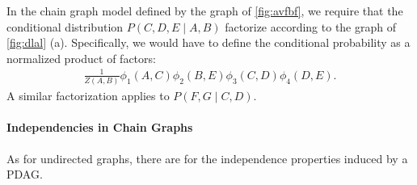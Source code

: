 \documentclass{article}
\begin{document}
\begin{exma}
In the chain graph model defined by the graph of \cref{fig:avfbf}, we require that the conditional distribution $P(C, D, E \mid A, B)$ factorize according to the graph of \cref{fig:dlal} (a). Specifically, we would have to define the conditional probability as a normalized product of factors:
\begin{align*}
\frac{1}{Z(A, B)} \phi_{1}(A, C) \phi_{2}(B, E) \phi_{3}(C, D) \phi_{4}(D, E) .
\end{align*}
A similar factorization applies to $P(F, G \mid C, D)$.
\end{exma}

\paragraph{Independencies in Chain Graphs}
As for undirected graphs, there are  for the independence properties induced by a PDAG. 
\end{document}
